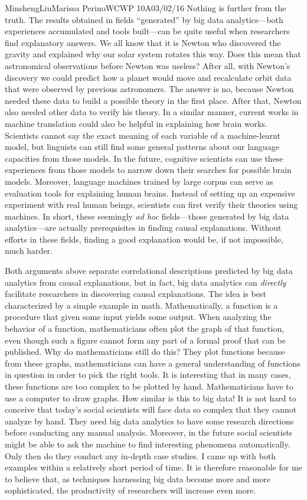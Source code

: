 \documentclass[12pt,letterpaper]{article}
\begin{document}
\begin{mla}{Minsheng}{Liu}{Marissa Perino}{WCWP 10A}{03/02/16}
Nothing is further from the truth. The results obtained in fields
``generated'' by big data analytics---both experiences accumulated and
tools built---can be quite useful when researchers find explanatory
answers. We all know that it is Newton who discovered the gravity and
explained why our solar system rotates this way. Does this mean that
astronomical observations before Newton was useless? After all, with
Newton's discovery we could predict how a planet would move and
recalculate orbit data that were observed by previous astronomers. The
answer is no, because Newton needed these data to build a possible
theory in the first place. After that, Newton also needed other data to
verify his theory. In a similar manner, current works in machine
translation could also be helpful in explaining how brain works.
Scientists cannot say the exact meaning of each variable of a
machine-learnt model, but linguists can still find some general patterns
about our language capacities from those models. In the future,
cognitive scientists can use these experiences from those models to
narrow down their searches for possible brain models. Moreover, language
machines trained by large corpus can serve as evaluation tools for
explaining human brains. Instead of setting up an expensive experiment
with real human beings, scientists can first verify their theories using
machines. In short, these seemingly \emph{ad hoc} fields---those
generated by big data analytics---are actually prerequisites in finding
causal explanations. Without efforts in these fields, finding a good
explanation would be, if not impossible, much harder.

Both arguments above separate correlational descriptions predicted by
big data analytics from causal explanations, but in fact, big data
analytics can \emph{directly} facilitate researchers in discovering
causal explanations. The idea is best characterized by a simple example
in math. Mathematically, a function is a procedure that given some input
yields some output. When analyzing the behavior of a function,
mathematicians often plot the graph of that function, even though such a
figure cannot form any part of a formal proof that can be published. Why
do mathematicians still do this? They plot functions because from these
graphs, mathematicians can have a general understanding of functions in
question in order to pick the right tools. It is interesting that in
many cases, these functions are too complex to be plotted by hand.
Mathematicians have to use a computer to draw graphs. How similar is
this to big data! It is not hard to conceive that today's social
scientists will face data so complex that they cannot analyze by hand.
They need big data analytics to have some research directions before
conducting any manual analysis. Moreover, in the future social
scientists might be able to ask the machine to find interesting
phenomena automatically. Only then do they conduct any in-depth case
studies. I came up with both examples within a relatively short period
of time. It is therefore reasonable for me to believe that, as
techniques harnessing big data become more and more sophisticated, the
productivity of researchers will increase even more.


\end{mla}
\end{document}
